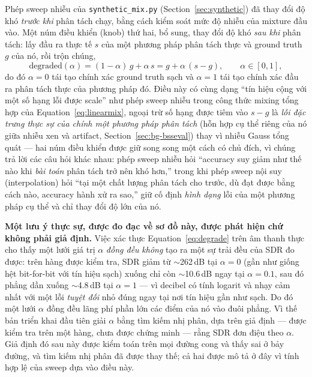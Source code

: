 \documentclass[11pt]{article}
\begin{document}
Phép sweep nhiễu của \texttt{synthetic\_mix.py} (Section~\ref{sec:synthetic})
đã thay đổi độ khó \emph{trước khi} phân tách chạy, bằng cách kiểm soát
mức độ nhiễu của mixture đầu vào. Một núm điều khiển (knob) thứ hai, bổ
sung, thay đổi độ khó \emph{sau khi} phân tách: lấy đầu ra thực tế $s$
của một phương pháp phân tách thực và ground truth $g$ của nó, rồi trộn
chúng,
\begin{equation}
\text{degraded}(\alpha) = (1-\alpha)\,g + \alpha\, s = g + \alpha\,(s-g),
\qquad \alpha\in[0,1],
\label{eq:degrade}
\end{equation}
do đó $\alpha{=}0$ tái tạo chính xác ground truth sạch và $\alpha{=}1$
tái tạo chính xác đầu ra phân tách thực của phương pháp đó. Điều này có
cùng dạng ``tín hiệu cộng với một số hạng lỗi được scale'' như phép sweep
nhiễu trong công thức mixing tổng hợp của Equation~\ref{eq:linearmix},
ngoại trừ số hạng được tiêm vào $s-g$ là \emph{lỗi đặc trưng thực sự của
chính một phương pháp phân tách} (hỗn hợp cụ thể riêng của nó giữa nhiễu
xen và artifact, Section~\ref{sec:bg-bsseval}) thay vì nhiễu Gauss tổng
quát --- hai núm điều khiển được giữ song song một cách có chủ đích, vì
chúng trả lời các câu hỏi khác nhau: phép sweep nhiễu hỏi ``accuracy suy
giảm như thế nào khi \emph{bài toán} phân tách trở nên khó hơn,'' trong
khi phép sweep nội suy (interpolation) hỏi ``tại một chất lượng phân
tách cho trước, dù đạt được bằng cách nào, accuracy hành xử ra sao,''
giữ cố định \emph{hình dạng} lỗi của một phương pháp cụ thể và chỉ thay
đổi độ lớn của nó.

\textbf{Một lưu ý thực sự, được đo đạc về sơ đồ này, được phát hiện chứ
không phải giả định.} Việc xác thực Equation~\ref{eq:degrade} trên âm
thanh thực cho thấy một lưới giá trị $\alpha$ \emph{đồng đều} \emph{không}
tạo ra một sự trải đều của SDR đo được: trên hàng được kiểm tra, SDR giảm
từ $\sim$262\,dB tại $\alpha{=}0$ (gần như giống hệt bit-for-bit với tín
hiệu sạch) xuống chỉ còn $\sim$10.6\,dB ngay tại $\alpha{=}0.1$, sau đó
phẳng dần xuống $\sim$4.8\,dB tại $\alpha{=}1$ --- vì decibel có tính
logarit và nhạy cảm nhất với một lỗi \emph{tuyệt đối} nhỏ đúng ngay tại
nơi tín hiệu gần như sạch. Do đó một lưới $\alpha$ đồng đều lãng phí phần
lớn các điểm của nó vào đuôi phẳng. Vì thế bản triển khai đầu tiên giải
$\alpha$ bằng tìm kiếm nhị phân, dựa trên giả định --- được kiểm tra trên
một hàng, chưa được chứng minh --- rằng SDR đơn điệu theo $\alpha$. Giả
định đó sau này được kiểm toán trên mọi đường cong và thấy sai ở bảy
đường, và tìm kiếm nhị phân đã được thay thế; cả hai được mô tả ở đây vì
tính hợp lệ của sweep dựa vào điều này.
\end{document}

